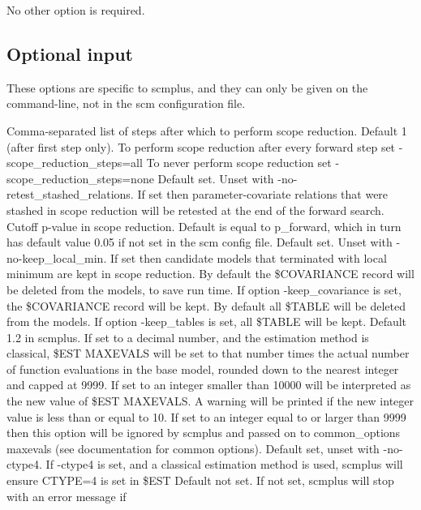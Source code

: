 \documentclass[hideglossary,notoc,hidelof,hidelot,hideTheSignaturePage,hideLinkCurrent,hideloa,pdfLatex,noClient,notitle,hideConfidential]{PMXstyle-20170118kajsa4}
\begin{document}
No other option is required.

\subsection{Optional input}
These options are specific to scmplus, and they can only be given on the command-line, not in the
scm configuration file.

\begin{optionlist}
Comma-separated list of steps after which to perform scope reduction. Default 1 (after first step only).
To perform scope reduction after every forward step set -scope\_reduction\_steps=all 
To never perform scope reduction set -scope\_reduction\_steps=none 
\nextopt
{}
Default set. Unset with -no-retest\_stashed\_relations.
If set then parameter-covariate relations that were stashed
in scope reduction will be retested at the end of the forward search.
\nextopt
{}
Cutoff p-value in scope reduction. Default is equal to p\_forward,
which in turn has default value 0.05 if not set in the scm config file.
\nextopt
{}
Default set. Unset with -no-keep\_local\_min. If set then candidate models that
terminated with local minimum are kept in scope reduction.
By default the \$COVARIANCE record will be deleted from the models, to save run time.
If option -keep\_covariance is set, the \$COVARIANCE record will be kept.
\nextopt
{}
By default all \$TABLE will be deleted from the models.
If option -keep\_tables is set, all \$TABLE will be kept.
\nextopt
{}
Default 1.2 in scmplus. 
If set to a decimal number, and the estimation method is classical,
\$EST MAXEVALS will be set to that number times 
the actual number of function evaluations in the base model,
rounded down to the nearest integer and capped at 9999. 
If set to an integer smaller than 10000 will be interpreted as the new value
of \$EST MAXEVALS. A warning will be printed if the new integer value is 
less than or equal to 10. 
If set to an integer equal to or larger than 9999 then this option
will be ignored by scmplus and passed on to common\_options maxevals
(see documentation for common options).
Default set, unset with -no-ctype4.
If -ctype4 is set, and a classical estimation method is used,
scmplus will ensure CTYPE=4 is set in \$EST
\nextopt
{}
Default not set.
If not set, scmplus will stop with an error message if

\end{optionlist}
\end{document}
